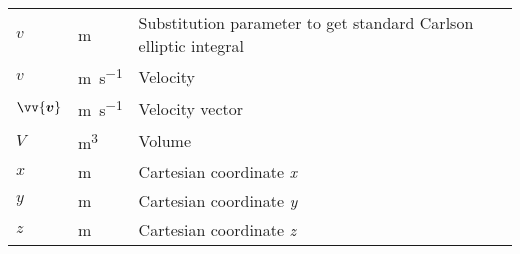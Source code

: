\begin{longtable}[l]{p{100pt} p{70pt} p{250pt}}
    $v$              & m                & Substitution parameter to get standard Carlson
                                          elliptic integral                                 \\
    $v$              & \si{\metre\per\second}            & Velocity                                          \\
    $\vv{\bm{v}}$    & \si{\metre\per\second}            & Velocity vector                                   \\
    $V$              & \si{\metre\cubed}            & Volume                                            \\
    $x$              & m                & Cartesian coordinate \emph{x}                     \\
    $y$              & m                & Cartesian coordinate \emph{y}                     \\
    $z$              & m                & Cartesian coordinate \emph{z}                     \\
\end{longtable}
\vspace{1cm}

